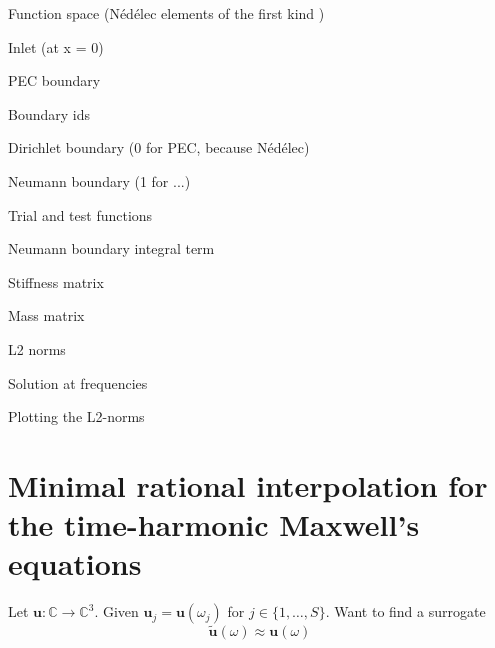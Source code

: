 \documentclass[11pt, a4paper]{article}
\begin{document}
Function space (Nédélec elements of the first kind \cite{monk})


Inlet (at x = 0)


PEC boundary


Boundary ids


Dirichlet boundary (0 for PEC, because Nédélec)


Neumann boundary (1 for ...)


Trial and test functions


Neumann boundary integral term


Stiffness matrix


Mass matrix


L2 norms


Solution at frequencies


Plotting the L2-norms



\newpage
\section{Minimal rational interpolation for the time-harmonic Maxwell's equations}
\label{sec:mri}

Let $\mathbf{u} : \mathbb{C} \to \mathbb{C}^3$.
Given $\mathbf{u}_j = \mathbf{u}(\omega_j)$ for $j \in \{1, \dots, S\}$. Want to find a surrogate
\begin{equation}
    \mathbf{\tilde{u}}(\omega) \approx \mathbf{u}(\omega)
\end{equation}
\end{document}
